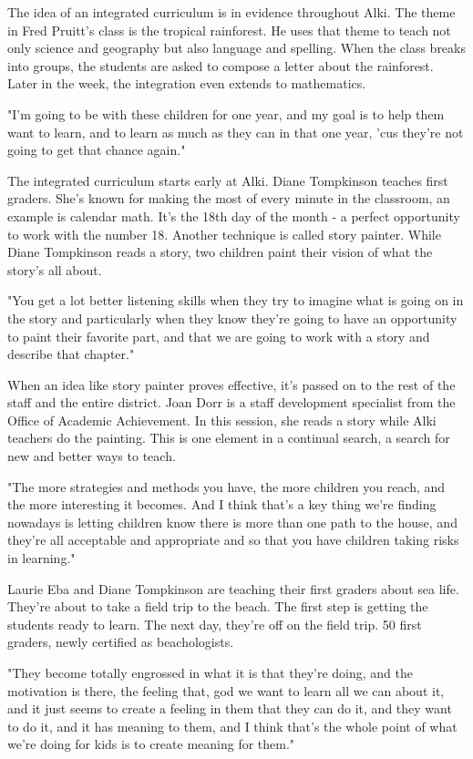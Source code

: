 The idea of an integrated curriculum is in evidence throughout Alki. The theme in Fred Pruitt's class is the tropical rainforest. He uses that theme to teach not only science and geography but also language and spelling. When the class breaks into groups, the students are asked to compose a letter about the rainforest. Later in the week, the integration even extends to mathematics.

"I'm going to be with these children for one year, and my goal is to help them want to learn, and to learn as much as they can in that one year, 'cus they're not going to get that chance again."

The integrated curriculum starts early at Alki. Diane Tompkinson teaches first graders. She's known for making the most of every minute in the classroom, an example is calendar math. It's the 18th day of the month - a perfect opportunity to work with the number 18. Another technique is called story painter. While Diane Tompkinson reads a story, two children paint their vision of what the story's all about.

"You get a lot better listening skills when they try to imagine what is going on in the story and particularly when they know they're going to have an opportunity to paint their favorite part, and that we are going to work with a story and describe that chapter."

When an idea like story painter proves effective, it's passed on to the rest of the staff and the entire district. Joan Dorr is a staff development specialist from the Office of Academic Achievement. In this session, she reads a story while Alki teachers do the painting. This is one element in a continual search, a search for new and better ways to teach.

"The more strategies and methods you have, the more children you reach, and the more interesting it becomes. And I think that's a key thing we're finding nowadays is letting children know there is more than one path to the house, and they're all acceptable and appropriate and so that you have children taking risks in learning."

Laurie Eba and Diane Tompkinson are teaching their first graders about sea life. They're about to take a field trip to the beach. The first step is getting the students ready to learn. The next day, they're off on the field trip. 50 first graders, newly certified as beachologists.

"They become totally engrossed in what it is that they're doing, and the motivation is there, the feeling that, god we want to learn all we can about it, and it just seems to create a feeling in them that they can do it, and they want to do it, and it has meaning to them, and I think that's the whole point of what we're doing for kids is to create meaning for them."

